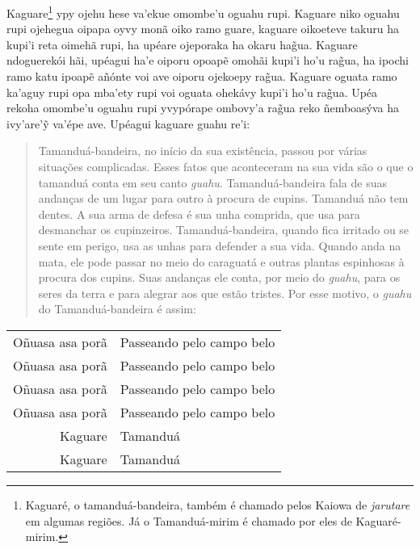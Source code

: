 \begin{itemize}
Kaguare\footnote{Kaguaré, o tamanduá-bandeira, também é chamado pelos
  Kaiowa de \emph{jarutare} em algumas regiões. Já o Tamanduá-mirim é
  chamado por eles de Kaguaré-mirim.} ypy ojehu hese va'ekue omombe'u
oguahu rupi. Kaguare niko oguahu rupi ojehegua oipapa oyvy monã oiko
ramo guare, kaguare oikoeteve takuru ha kupi'i reta oimehã rupi, ha
upéare ojeporaka ha okaru hag̃ua. Kaguare ndoguerekói hãi, upéagui ha'e
oiporu opoapẽ omohãi kupi'i ho'u rag̃ua, ha ipochi ramo katu ipoapẽ
añónte voi ave oiporu ojekoepy rag̃ua. Kaguare oguata ramo ka'aguy rupi
opa mba'ety rupi voi oguata ohekávy kupi'i ho'u rag̃ua. Upéa rekoha
omombe'u oguahu rupi yvypórape ombovy'a rag̃ua reko ñemboasýva ha
ivy'are'ỹ va'épe ave. Upéagui kaguare guahu re'i:

\begin{quote}
Tamanduá-bandeira, no início da sua existência, passou por várias
situações complicadas. Esses fatos que aconteceram na sua vida são o que
o tamanduá conta em seu canto \emph{guahu}. Tamanduá-bandeira fala de
suas andanças de um lugar para outro à procura de cupins. Tamanduá não
tem dentes. A sua arma de defesa é sua unha comprida, que usa para
desmanchar os cupinzeiros. Tamanduá-bandeira, quando fica irritado ou se
sente em perigo, usa as unhas para defender a sua vida. Quando anda na
mata, ele pode passar no meio do caraguatá e outras plantas espinhosas à
procura dos cupins. Suas andanças ele conta, por meio do \emph{guahu},
para os seres da terra e para alegrar aos que estão tristes. Por esse
motivo, o \emph{guahu} do Tamanduá-bandeira é assim:
\end{quote}

\begin{table}[]
\begin{tabular}{rl}
Oñuasa\footnotemark{} asa porã          & Passeando pelo campo belo           \\
Oñuasa asa porã          & Passeando pelo campo belo           \\
Oñuasa asa porã  		& Passeando pelo campo belo \\
Oñuasa asa porã          & Passeando pelo campo belo           \\
Kaguare          & Tamanduá           \\
Kaguare          & Tamanduá           \\                  
\end{tabular}
\end{table}




\end{itemize}
